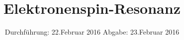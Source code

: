 

\subject{Fortgeschrittenen-Praktikum V28}
\title{Elektronenspin-Resonanz}
\date{
  Durchführung: 22.Februar 2016
  \hspace{3em}
  Abgabe: 23.Februar 2016
}



\maketitle
\thispagestyle{empty}
\tableofcontents
\newpage






\printbibliography


